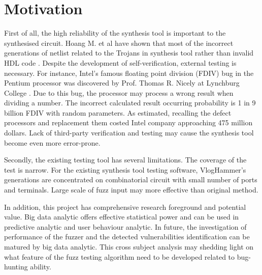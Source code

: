 \section{Motivation}
First of all, the high reliability of the synthesis tool is important to the synthesised circuit. Hoang M. et al have shown that most of the incorrect generations of netlist related to the Trojans in synthesis tool rather than invalid HDL code \cite{torjans}. Despite the development of self-verification, external testing is necessary. For instance, Intel's famous floating point division (FDIV) bug in the Pentium processor was discovered by Prof. Thomas R. Nicely at Lynchburg College \cite{Intelbug}. Due to this bug, the processor may process a wrong result when dividing a number. The incorrect calculated result occurring probability is 1 in 9 billion FDIV with random parameters. As estimated, recalling the defect processors and replacement them costed Intel company approaching 475 million dollars. Lack of third-party verification and testing may cause the synthesis tool become even more error-prone.

Secondly, the existing testing tool has several limitations. The coverage of the test is narrow. For the existing synthesis tool testing software, VlogHammer's generations are concentrated on combinatorial circuit with small number of ports and terminals. Large scale of fuzz input may more effective than original method. 

In addition, this project has comprehensive research foreground 
and potential value.
Big data analytic offers effective statistical power and can be used in predictive analytic and user behaviour analytic. In future, the investigation of performance of the fuzzer and the detected vulnerabilities identification can be matured by big data analytic. This cross subject analysis may shedding light on what feature of the fuzz testing algorithm need to be developed related to bug-hunting ability.
